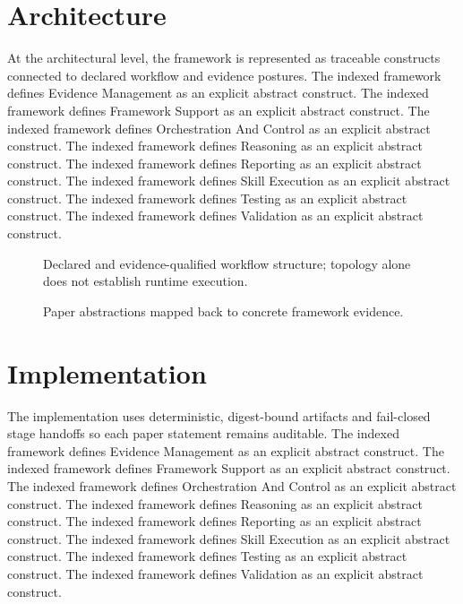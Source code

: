 \documentclass[11pt]{article}
\begin{document}
\section{Architecture}

At the architectural level, the framework is represented as traceable constructs connected to declared workflow and evidence postures. The indexed framework defines Evidence Management as an explicit abstract construct. The indexed framework defines Framework Support as an explicit abstract construct. The indexed framework defines Orchestration And Control as an explicit abstract construct. The indexed framework defines Reasoning as an explicit abstract construct. The indexed framework defines Reporting as an explicit abstract construct. The indexed framework defines Skill Execution as an explicit abstract construct. The indexed framework defines Testing as an explicit abstract construct. The indexed framework defines Validation as an explicit abstract construct.

\begin{figure}[ht]\centering{}\caption{Declared and evidence-qualified workflow structure; topology alone does not establish runtime execution.}\label{fig:framework-workflow}\end{figure}

\begin{figure}[ht]\centering{}\caption{Paper abstractions mapped back to concrete framework evidence.}\label{fig:framework-abstraction}\end{figure}

\section{Implementation}

The implementation uses deterministic, digest-bound artifacts and fail-closed stage handoffs so each paper statement remains auditable. The indexed framework defines Evidence Management as an explicit abstract construct. The indexed framework defines Framework Support as an explicit abstract construct. The indexed framework defines Orchestration And Control as an explicit abstract construct. The indexed framework defines Reasoning as an explicit abstract construct. The indexed framework defines Reporting as an explicit abstract construct. The indexed framework defines Skill Execution as an explicit abstract construct. The indexed framework defines Testing as an explicit abstract construct. The indexed framework defines Validation as an explicit abstract construct.
\end{document}
